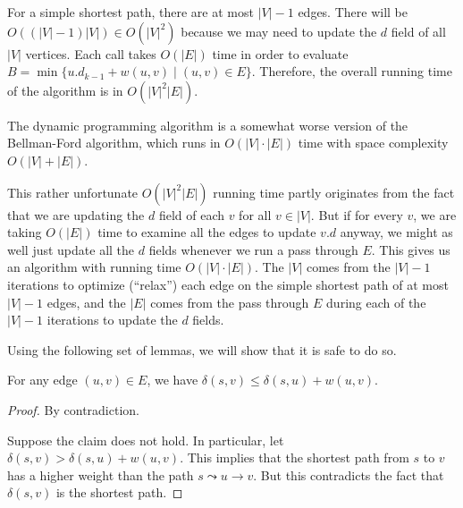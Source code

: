 For a simple shortest path, there are at most $|V|-1$ edges. There will be $O((|V|-1)|V|) \in O(|V|^2)$ because we may need to update the $d$ field of all $|V|$ vertices. Each call takes $O(|E|)$ time in order to evaluate $B = \min\{u.d_{k-1} + w(u,v) \mid (u,v) \in E \}$. Therefore, the overall running time of the algorithm is in $O(|V|^2|E|)$.

The dynamic programming algorithm is a somewhat worse version of the Bellman-Ford algorithm, which runs in $O(|V|\cdot|E|)$ time with space complexity $O(|V| + |E|)$.

This rather unfortunate $O(|V|^2|E|)$ running time partly originates from the fact that we are updating the $d$ field of each $v$ for all $v \in |V|$. But if for every $v$, we are taking $O(|E|)$ time to examine all the edges to update $v.d$ anyway, we might as well just update all the $d$ fields whenever we run a pass through $E$. This gives us an algorithm with running time $O(|V|\cdot |E|)$. The $|V|$ comes from the $|V|-1$ iterations to optimize (``relax'') each edge on the simple shortest path of at most $|V|-1$ edges, and the $|E|$ comes from the pass through $E$ during each of the $|V|-1$ iterations to update the $d$ fields.

Using the following set of lemmas, we will show that it is safe to do so.

\begin{lemma} 
    For any edge $(u,v) \in E$, we have $\delta(s,v) \leq \delta(s,u) + w(u,v)$.
\end{lemma}
\begin{proof}
    By contradiction.

    Suppose the claim does not hold. In particular, let $\delta(s,v) > \delta(s,u) + w(u,v)$. This implies that the shortest path from $s$ to $v$ has a higher weight than the path $s \leadsto u \to v$. But this contradicts the fact that $\delta(s,v)$ is the shortest path.
\end{proof}

